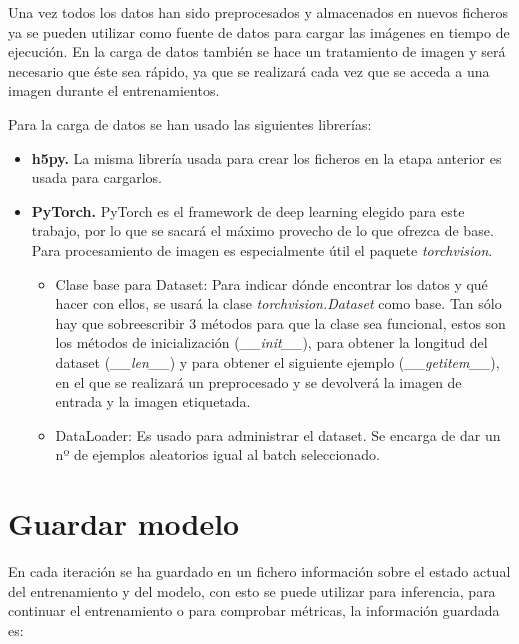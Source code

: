 Una vez todos los datos han sido preprocesados y almacenados en nuevos ficheros ya se pueden utilizar como fuente de datos para cargar las imágenes en tiempo de ejecución. En la carga de datos también se hace un tratamiento de imagen y será necesario que éste sea rápido, ya que se realizará cada vez que se acceda a una imagen durante el entrenamientos.

Para la carga de datos se han usado las siguientes librerías:
\begin{itemize}
\item \textbf{h5py.} La misma librería usada para crear los ficheros en la etapa anterior es usada para cargarlos.
\item \textbf{PyTorch.} PyTorch es el framework de deep learning elegido para este trabajo, por lo que se sacará el máximo provecho de lo que ofrezca de base. Para procesamiento de imagen es especialmente útil el paquete \textit{torchvision}.
\begin{itemize}
\item Clase base para Dataset: Para indicar dónde encontrar los datos y qué hacer con ellos, se usará la clase \textit{torchvision.Dataset} como base. Tan sólo hay que sobreescribir 3 métodos para que la clase sea funcional, estos son los métodos de inicialización (\textit{\_\_init\_\_}), para obtener la longitud del dataset (\textit{\_\_len\_\_}) y para obtener el siguiente ejemplo (\textit{\_\_getitem\_\_}), en el que se realizará un preprocesado y se devolverá la imagen de entrada y la imagen etiquetada.
\item DataLoader: Es usado para administrar el dataset. Se encarga de dar un nº de ejemplos aleatorios igual al batch seleccionado.
\end{itemize}
\end{itemize}

\section{Guardar modelo}\label{sec:store_model}

En cada iteración se ha guardado en un fichero información sobre el estado actual del entrenamiento y del modelo, con esto se puede utilizar para inferencia, para continuar el entrenamiento o para comprobar métricas, la información guardada es:

